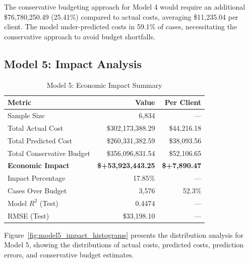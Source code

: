The conservative budgeting approach for Model 4 would require an additional \$76,780,250.49 (25.41\%) compared to actual costs, averaging \$11,235.04 per client. The model under-predicted costs in 59.1\% of cases, necessitating the conservative approach to avoid budget shortfalls.

\clearpage

\subsection{Model 5: Impact Analysis}
\label{subsec:model5_impact}

\begin{table}[htbp]
\centering
\small
\caption{Model 5: Economic Impact Summary}
\label{tab:model5_impact_summary}
\begin{tabular}{lrr}
\toprule
\textbf{Metric} & \textbf{Value} & \textbf{Per Client} \\
\midrule
Sample Size & 6,834 & --- \\
\midrule
Total Actual Cost & \$302,173,388.29 & \$44,216.18 \\
Total Predicted Cost & \$260,331,382.59 & \$38,093.56 \\
Total Conservative Budget & \$356,096,831.54 & \$52,106.65 \\
\midrule
\textbf{Economic Impact} & \textbf{\$+53,923,443.25} & \textbf{\$+7,890.47} \\
Impact Percentage & 17.85\% & --- \\
\midrule
Cases Over Budget & 3,576 & 52.3\% \\
\midrule
Model $R^2$ (Test) & 0.4474 & --- \\
RMSE (Test) & \$33,198.10 & --- \\
\bottomrule
\end{tabular}
\end{table}

Figure~\ref{fig:model5_impact_histograms} presents the distribution analysis for Model 5, showing the distributions of actual costs, predicted costs, prediction errors, and conservative budget estimates.

